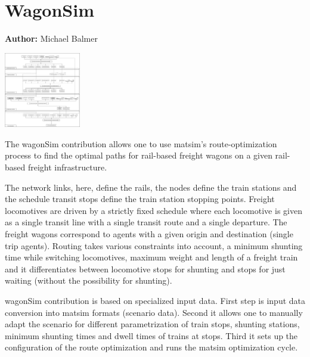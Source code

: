 \chapter{WagonSim}
\label{ch:wagonSim}

\hfill \textbf{Author:} Michael Balmer

\begin{center} \includegraphics[width=0.25\textwidth, angle=0]{extending/figures/wagonsim/wagonSimProcessChain.png} \end{center}


The wagonSim \gls{contribution} allows one to use \gls{matsim}'s route-optimization process to find the optimal paths for rail-based freight wagons on a given rail-based freight infrastructure.

The network links, here, define the rails, the nodes define the train stations and the schedule transit stops define the train station stopping points. 
Freight locomotives are driven by a strictly fixed schedule where each locomotive is given as a single transit line with a single transit route and a single departure. 
The freight wagons correspond to agents with a given origin and destination (single trip agents). 
Routing takes various constraints into account, \ie a minimum shunting time while switching locomotives, maximum weight and length of a freight train and it differentiates between locomotive stops for shunting and stops for just waiting (without the possibility for shunting).

wagonSim \gls{contribution} is based on specialized input data. 
First step is input data conversion into \gls{matsim} formats (scenario data). Second it allows one to manually adapt the scenario for different parametrization of train stops, shunting stations, minimum shunting times and dwell times of trains at stops. 
Third it sets up the configuration of the route optimization and runs the \gls{matsim} optimization cycle.

